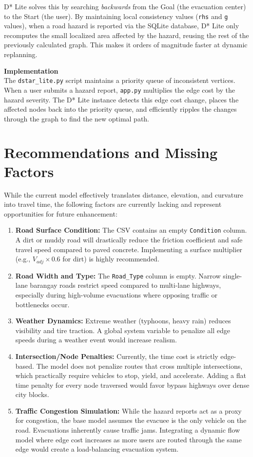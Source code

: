 \documentclass[12pt, a4paper]{article}
\begin{document}
D* Lite solves this by searching \textit{backwards} from the Goal (the evacuation center) to the Start (the user). By maintaining local consistency values (\texttt{rhs} and \texttt{g} values), when a road hazard is reported via the SQLite database, D* Lite only recomputes the small localized area affected by the hazard, reusing the rest of the previously calculated graph. This makes it orders of magnitude faster at dynamic replanning.

\textbf{Implementation} \\
The \texttt{dstar\_lite.py} script maintains a priority queue of inconsistent vertices. When a user submits a hazard report, \texttt{app.py} multiplies the edge cost by the hazard severity. The D* Lite instance detects this edge cost change, places the affected nodes back into the priority queue, and efficiently ripples the changes through the graph to find the new optimal path.

\newpage
\section{Recommendations and Missing Factors}

While the current model effectively translates distance, elevation, and curvature into travel time, the following factors are currently lacking and represent opportunities for future enhancement:

\begin{enumerate}
    \item \textbf{Road Surface Condition:} The CSV contains an empty \texttt{Condition} column. A dirt or muddy road will drastically reduce the friction coefficient and safe travel speed compared to paved concrete. Implementing a surface multiplier (e.g., $V_{adj} \times 0.6$ for dirt) is highly recommended.
    \item \textbf{Road Width and Type:} The \texttt{Road\_Type} column is empty. Narrow single-lane barangay roads restrict speed compared to multi-lane highways, especially during high-volume evacuations where opposing traffic or bottlenecks occur.
    \item \textbf{Weather Dynamics:} Extreme weather (typhoons, heavy rain) reduces visibility and tire traction. A global system variable to penalize all edge speeds during a weather event would increase realism.
    \item \textbf{Intersection/Node Penalties:} Currently, the time cost is strictly edge-based. The model does not penalize routes that cross multiple intersections, which practically require vehicles to stop, yield, and accelerate. Adding a flat time penalty for every node traversed would favor bypass highways over dense city blocks.
    \item \textbf{Traffic Congestion Simulation:} While the hazard reports act as a proxy for congestion, the base model assumes the evacuee is the only vehicle on the road. Evacuations inherently cause traffic jams. Integrating a dynamic flow model where edge cost increases as more users are routed through the same edge would create a load-balancing evacuation system.
\end{enumerate}
\end{document}
